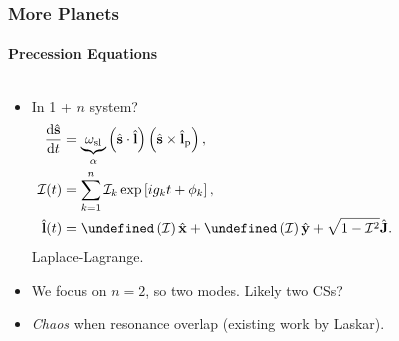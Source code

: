 \documentclass[dvipsnames]{beamer}
\newcommand*{\rd}[2]{\frac{\mathrm{d}#1}{\mathrm{d}#2}}
\newcommand*{\bm}[1]{\boldsymbol{\mathbf{#1}}}
\newcommand*{\uv}[1]{\hat{\bm{#1}}}
\newcommand*{\p}[1]{\left(#1\right)}
\newcommand*{\s}[1]{\left[#1\right]}
\let\Re\undefined
\let\Im\undefined
\DeclareMathOperator{\Re}{Re}
\DeclareMathOperator{\Im}{Im}
\begin{document}
\begin{frame}
    \frametitle{More Planets}
    \framesubtitle{Precession Equations}

    \begin{columns}
        \begin{column}{0.6\columnwidth}
            \begin{itemize}
                \item In 1 + $n$ system?
                    \begin{align*}
                        \rd{\uv{s}}{t} &= \underbrace{\omega_{\rm sl}}_\alpha
                            \p{\uv{s} \cdot \uv{l}}
                            \p{\uv{s} \times \uv{l}_{\rm p}},\\
                        \mathcal{I}(t) &= \sum\limits_{k = 1}^{n}
                            \mathcal{I}_k \exp\s{ig_kt + \phi_k},\\
                        \uv{l}(t) &= \Re\p{\mathcal{I}}\uv{x}
                            + \Im\p{\mathcal{I}}\uv{y}
                            + \sqrt{1 - \mathcal{I}^2}\uv{J}.
                    \end{align*}
                    Laplace-Lagrange.

                \item We focus on $n = 2$, so two modes. Likely two CSs?

                \item \emph{Chaos} when resonance overlap (existing work by
                    Laskar).
            \end{itemize}
        \end{column}
        \begin{column}{0.4\columnwidth}
            \begin{figure}
                \centering
            \end{figure}
        \end{column}
    \end{columns}
\end{frame}
\end{document}
